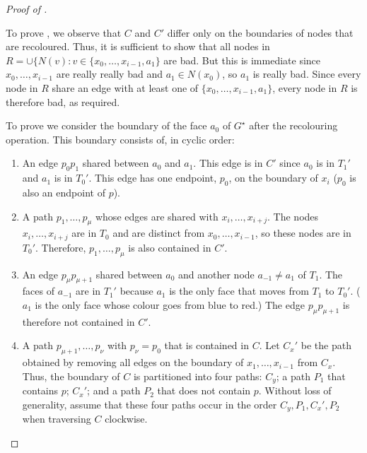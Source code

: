\documentclass{patmorin}
\newcommand{\dual}[1]{{#1}^\star}
\begin{document}
\begin{proof}[Proof of ]
\begin{enumerate}
   To prove , we observe that $C$ and $C'$ differ only on
   the boundaries of nodes that are recoloured.  Thus, it is sufficient
   to show that all nodes in $R=\cup\{N(v): v\in\{x_0,\ldots,x_{i-1},a_1\}$
   are bad.  But this is immediate since $x_0,\ldots,x_{i-1}$ are really
   really bad and $a_1\in N(x_0)$, so $a_1$ is really bad.  Since every node in $R$ share an edge with at least one of $\{x_0,\ldots,x_{i-1},a_1\}$, every
   node in $R$ is therefore bad, as required.

   To prove  we consider the boundary of the face
   $a_0$ of $\dual{G}$ after the recolouring operation.  This boundary
   consists of, in cyclic order:
   \begin{enumerate}
     \item  An edge $p_0p_1$ shared between $a_0$ and $a_1$.  This edge is in
       $C'$ since $a_0$ is in $T_1'$ and $a_1$ is in $T_0'$. This edge has one endpoint, $p_0$, on the boundary of $x_i$ ($p_0$ is also an endpoint of $p$).

     \item A path $p_1,\ldots,p_\mu$ whose edges are shared with $x_i,\ldots,x_{i+j}$.  The nodes $x_i,\ldots,x_{i+j}$ are in $T_0$ and are distinct from $x_0,\ldots,x_{i-1}$, so these nodes are in $T_0'$.
     Therefore, $p_1,\ldots,p_\mu$ is also contained in $C'$.

     \item An edge $p_\mu p_{\mu+1}$ shared between $a_0$ and another node $a_{-1}\neq
     a_1$ of $T_1$. The faces of $a_{-1}$ are in $T_1'$ because $a_1$
     is the only face that moves from $T_1$ to $T_0'$. ($a_1$ is the
     only face whose colour goes from blue to red.)  The edge $p_\mu p_{\mu+1}$ is therefore not contained in $C'$.

     \item A path $p_{\mu+1},\ldots,p_\nu$ with $p_\nu=p_0$ that is contained in $C$. Let $C_x'$ be the path obtained by removing all edges on the boundary of $x_1,\ldots,x_{i-1}$ from $C_x$.  Thus, the boundary of $C$ is partitioned into four paths: $C_y$; a path $P_1$ that contains $p$; $C_x'$; and a path $P_2$ that does not contain $p$.  Without loss of generality, assume that these four paths occur in the order $C_y,P_1,C_x',P_2$ when traversing $C$ clockwise.


\end{enumerate}
\end{enumerate}
\end{proof}
\end{document}
